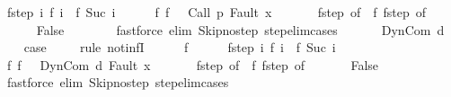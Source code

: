\begin{isabellebody}
\ f{\isacharunderscore}step{\isacharcolon}\ {\isachardoublequoteopen}{\isasymAnd}i{\isachardot}\ {\isasymGamma}{\isasymturnstile}f\ i\ {\isasymrightarrow}\ f\ {\isacharparenleft}Suc\ i{\isacharparenright}{\isachardoublequoteclose}\isanewline
\ \ \ \ \isamarkupfalse%
\ f{\isacharunderscore}{}{\isacharcolon}\ {\isachardoublequoteopen}f\ {}\ {\isacharequal}\ {\isacharparenleft}Call\ p{\isacharcomma}\ Fault\ x{\isacharparenright}{\isachardoublequoteclose}\ \isanewline
\ \ \ \ \isamarkupfalse%
\ f{\isacharunderscore}step\ {\isacharbrackleft}of\ {}{\isacharbrackright}\ f{\isacharunderscore}{}\ f{\isacharunderscore}step\ {\isacharbrackleft}of\ {}{\isacharbrackright}\isanewline
\ \ \ \ \isamarkupfalse%
\ False\isanewline
\ \ \ \ \ \ \isamarkupfalse%
\ {\isacharparenleft}fastforce\ elim{\isacharcolon}\ Skip{\isacharunderscore}no{\isacharunderscore}step\ step{\isacharunderscore}elim{\isacharunderscore}cases{\isacharparenright}\isanewline
\ \ \isamarkupfalse%
\isanewline
{}\isamarkupfalse%
\isanewline
\ \ \isamarkupfalse%
\ {\isacharparenleft}DynCom\ d{\isacharparenright}\ \isanewline
\ \ \isamarkupfalse%
\ {\isacharquery}case\ \isanewline
\ \ \isamarkupfalse%
\ {\isacharparenleft}rule\ not{\isacharunderscore}infI{\isacharparenright}\isanewline
\ \ \ \ \isamarkupfalse%
\ f\isanewline
\ \ \ \ \isamarkupfalse%
\ f{\isacharunderscore}step{\isacharcolon}\ {\isachardoublequoteopen}{\isasymAnd}i{\isachardot}\ {\isasymGamma}{\isasymturnstile}f\ i\ {\isasymrightarrow}\ f\ {\isacharparenleft}Suc\ i{\isacharparenright}{\isachardoublequoteclose}\isanewline
\ \ \ \ \isamarkupfalse%
\ f{\isacharunderscore}{}{\isacharcolon}\ {\isachardoublequoteopen}f\ {}\ {\isacharequal}\ {\isacharparenleft}DynCom\ d{\isacharcomma}\ Fault\ x{\isacharparenright}{\isachardoublequoteclose}\ \isanewline
\ \ \ \ \isamarkupfalse%
\ f{\isacharunderscore}step\ {\isacharbrackleft}of\ {}{\isacharbrackright}\ f{\isacharunderscore}{}\ f{\isacharunderscore}step\ {\isacharbrackleft}of\ {}{\isacharbrackright}\isanewline
\ \ \ \ \isamarkupfalse%
\ False\isanewline
\ \ \ \ \ \ \isamarkupfalse%
\ {\isacharparenleft}fastforce\ elim{\isacharcolon}\ Skip{\isacharunderscore}no{\isacharunderscore}step\ step{\isacharunderscore}elim{\isacharunderscore}cases{\isacharparenright}\isanewline

\end{isabellebody}
